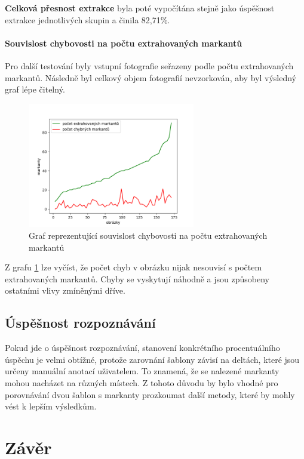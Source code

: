 \textbf{Celková přesnost extrakce} byla poté vypočítána stejně jako úspěšnost extrakce jednotlivých skupin a činila 82,71\%.

\subsubsection{Souvislost chybovosti na počtu extrahovaných markantů}

Pro další testování byly vstupní fotografie seřazeny podle počtu extrahovaných markantů. Následně byl celkový objem fotografií nevzorkován, aby byl výsledný graf lépe čitelný.


\begin{figure}[h]
	\centering
	\includegraphics[width=0.65\textwidth]{obrazky/graph2.png}
	\caption{Graf reprezentující souvislost chybovosti na počtu extrahovaných markantů}
	\label{graph2}
\end{figure} 

Z grafu \ref{graph2} lze vyčíst, že počet chyb v obrázku nijak nesouvisí s počtem extrahovaných markantů. Chyby se vyskytují náhodně a jsou způsobeny ostatními vlivy zmíněnými dříve.

\section{Úspěšnost rozpoznávání}
Pokud jde o úspěšnost rozpoznávání, stanovení konkrétního procentuálního úspěchu je velmi obtížné, protože zarovnání šablony závisí na deltách, které jsou určeny manuální anotací uživatelem. To znamená, že se nalezené markanty mohou nacházet na různých místech. Z tohoto důvodu by bylo vhodné pro porovnávání dvou šablon s markanty prozkoumat další metody, které by mohly vést k lepším výsledkům.


\chapter{Závěr}

